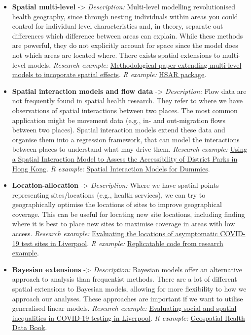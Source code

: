 \documentclass[
]{book}
\begin{document}
\begin{itemize}
\item
  \textbf{Spatial multi-level} -\textgreater{} \emph{Description:} Multi-level modelling revolutionised health geography, since through nesting individuals within areas you could control for individual level characteristics and, in theory, separate out differences which difference between areas can explain. While these methods are powerful, they do not explicitly account for space since the model does not which areas are located where. There exists spatial extensions to multi-level models. \emph{Research example:} \href{https://journals.plos.org/plosone/article?id=10.1371/journal.pone.0130761}{Methodological paper extending multi-level models to incoporate spatial effects}. \emph{R example:} \href{https://cran.r-project.org/web/packages/HSAR/HSAR.pdf}{HSAR package}.
\item
  \textbf{Spatial interaction models and flow data} -\textgreater{} \emph{Description:} Flow data are not frequently found in spatial health research. They refer to where we have observations of spatial interactions between two places. The most common application might be movement data (e.g., in- and out-migration flows between two places). Spatial interaction models extend these data and organise them into a regression framework, that can model the interactions between places to understand what may drive them. \emph{Research example:} \href{https://www.mdpi.com/2071-1050/9/11/1924}{Using a Spatial Interaction Model to Assess the Accessibility of District Parks in Hong Kong}. \emph{R example:} \href{https://rpubs.com/adam_dennett/257231}{Spatial Interaction Models for Dummies}.
\item
  \textbf{Location-allocation} -\textgreater{} \emph{Description:} Where we have spatial points representing sites/locations (e.g., health services), we can try to geographically optimise the locations of sites to improve geographical coverage. This can be useful for locating new site locations, including finding where it is best to place new sites to maximise coverage in areas with low access. \emph{Research example:} \href{https://extra.shu.ac.uk/ppp-online/wp-content/uploads/2021/04/thinking-spatially-roll-out-testing-liverpool.pdf}{Evaluating the locations of asymptomatic COVID-19 test sites in Liverpool}. \emph{R example:} \href{https://github.com/markagreen/mapping_test_accessibility/blob/main/scripts/location_allocation_model.R}{Replicatable code from research example}.
\item
  \textbf{Bayesian extensions} -\textgreater{} \emph{Description:} Bayesian models offer an alternative approach to analysis than frequentist methods. There are a lot of different spatial extensions to Bayesian models, allowing for more flexibility to how we approach our analyses. These approaches are important if we want to utilise generalised linear models. \emph{Research example:} \href{https://www.sciencedirect.com/science/article/pii/S2666776221000843}{Evaluating social and spatial inequalities in COVID-19 testing in Liverpool}. \emph{R example:} \href{https://www.paulamoraga.com/book-geospatial/}{Geospatial Health Data Book}.

\end{itemize}
\end{document}
